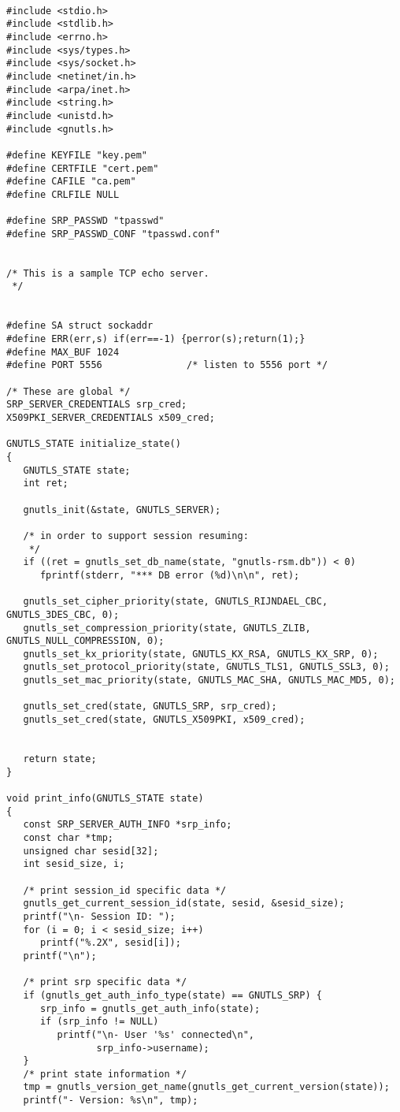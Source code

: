 \begin{verbatim}

#include <stdio.h>
#include <stdlib.h>
#include <errno.h>
#include <sys/types.h>
#include <sys/socket.h>
#include <netinet/in.h>
#include <arpa/inet.h>
#include <string.h>
#include <unistd.h>
#include <gnutls.h>

#define KEYFILE "key.pem"
#define CERTFILE "cert.pem"
#define CAFILE "ca.pem"
#define CRLFILE NULL

#define SRP_PASSWD "tpasswd"
#define SRP_PASSWD_CONF "tpasswd.conf"


/* This is a sample TCP echo server.
 */


#define SA struct sockaddr
#define ERR(err,s) if(err==-1) {perror(s);return(1);}
#define MAX_BUF 1024
#define PORT 5556               /* listen to 5556 port */

/* These are global */
SRP_SERVER_CREDENTIALS srp_cred;
X509PKI_SERVER_CREDENTIALS x509_cred;

GNUTLS_STATE initialize_state()
{
   GNUTLS_STATE state;
   int ret;

   gnutls_init(&state, GNUTLS_SERVER);

   /* in order to support session resuming:
    */
   if ((ret = gnutls_set_db_name(state, "gnutls-rsm.db")) < 0)
      fprintf(stderr, "*** DB error (%d)\n\n", ret);

   gnutls_set_cipher_priority(state, GNUTLS_RIJNDAEL_CBC, GNUTLS_3DES_CBC, 0);
   gnutls_set_compression_priority(state, GNUTLS_ZLIB, GNUTLS_NULL_COMPRESSION, 0);
   gnutls_set_kx_priority(state, GNUTLS_KX_RSA, GNUTLS_KX_SRP, 0);
   gnutls_set_protocol_priority(state, GNUTLS_TLS1, GNUTLS_SSL3, 0);
   gnutls_set_mac_priority(state, GNUTLS_MAC_SHA, GNUTLS_MAC_MD5, 0);

   gnutls_set_cred(state, GNUTLS_SRP, srp_cred);
   gnutls_set_cred(state, GNUTLS_X509PKI, x509_cred);


   return state;
}

void print_info(GNUTLS_STATE state)
{
   const SRP_SERVER_AUTH_INFO *srp_info;
   const char *tmp;
   unsigned char sesid[32];
   int sesid_size, i;

   /* print session_id specific data */
   gnutls_get_current_session_id(state, sesid, &sesid_size);
   printf("\n- Session ID: ");
   for (i = 0; i < sesid_size; i++)
      printf("%.2X", sesid[i]);
   printf("\n");

   /* print srp specific data */
   if (gnutls_get_auth_info_type(state) == GNUTLS_SRP) {
      srp_info = gnutls_get_auth_info(state);
      if (srp_info != NULL)
         printf("\n- User '%s' connected\n",
                srp_info->username);
   }
   /* print state information */
   tmp = gnutls_version_get_name(gnutls_get_current_version(state));
   printf("- Version: %s\n", tmp);


\end{verbatim}
